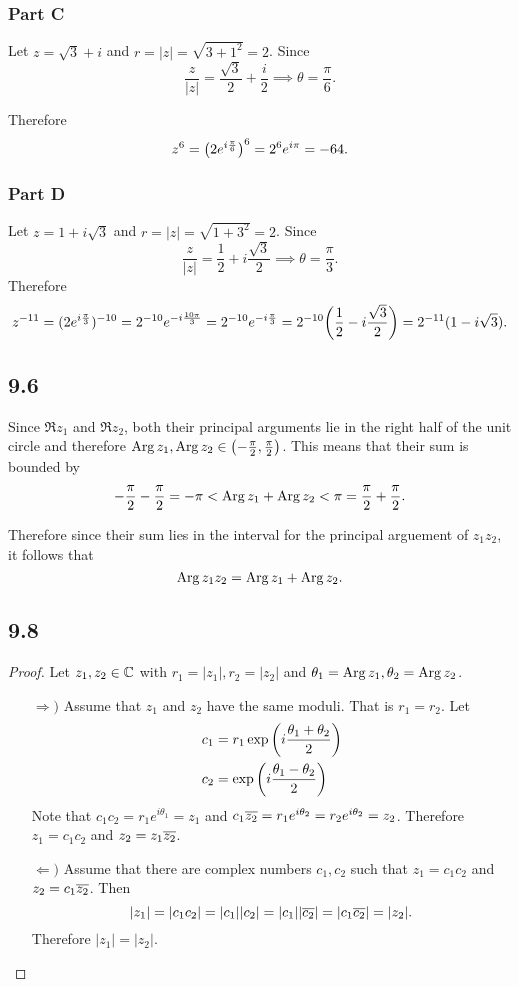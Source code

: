 \documentclass[12pt,titlepage]{extarticle}
\begin{document}
\subsubsection*{Part C}
Let $z = \sqrt{3} + i$ and $r = |z| = \sqrt{3 + 1^2} = 2$. Since
\[
    \frac{z}{|z|} = \frac{\sqrt{3}}{2} + \frac{i}{2} \implies \theta = \frac{\pi}{6}
.\]

Therefore
\[
    z^6 = \qty(2e^{i \frac{\pi}{6}})^6 = 2^6 e^{i \pi} = -64
.\]


\subsubsection*{Part D}
Let $z = 1 + i \sqrt{3}$ and $r = |z| = \sqrt{1 + 3^2} = 2$. Since
\[
    \frac{z}{|z|} = \frac{1}{2} + i\frac{\sqrt{3}}{2} \implies \theta = \frac{\pi}{3}
.\]
Therefore
\[
    z^{-11} = (2 e^{i \frac{\pi}{3}})^{-10} = 2^{-10} e^{-i \frac{10 \pi}{3}} = 2^{-10} e^{-i \frac{\pi}{3}} = 2^{-10} \qty(\frac{1}{2} - i\frac{\sqrt{3}}{2}) = 2^{-11} (1 - i\sqrt{3})
.\]


\subsection*{9.6}
Since $\Re z_1$ and $\Re z_2$, both their principal arguments lie in the right half of the unit circle and therefore $\operatorname{Arg} z_1, \operatorname{Arg} z_2 \in \qty(-\frac{\pi}{2}, \frac{\pi}{2})$. This means that their sum is bounded by
\[
    -\frac{\pi}{2} - \frac{\pi}{2} = -\pi < \operatorname{Arg} z_1 + \operatorname{Arg} z_2 < \pi = \frac{\pi}{2} + \frac{\pi}{2}
.\]

Therefore since their sum lies in the interval for the principal arguement of $z_1z_2$, it follows that
\[
    \operatorname{Arg} z_1 z_2 = \operatorname{Arg} z_1 + \operatorname{Arg} z_2
.\]

\subsection*{9.8}
\begin{proof}
    Let $z_1, z_2 \in \mathbb{C}$ with $r_1 = |z_1|, r_2 = |z_2|$ and $\theta_1 = \operatorname{Arg} z_1, \theta_2 = \operatorname{Arg} z_2$.
    \begin{enumerate}
        \item[$\Rightarrow)$]
            Assume that $z_1$ and $z_2$ have the same moduli. That is $r_1 = r_2$. Let
            \begin{align*}
                c_1 &= r_1 \exp\qty(i \frac{\theta_1 + \theta_2}{2}) \\
                c_2 &= \exp\qty(i \frac{\theta_1 - \theta_2}{2})
            \end{align*}
            Note that $c_1 c_2 = r_1 e^{i \theta_1} = z_1$ and $c_1 \overline{z_2} = r_1 e^{i \theta_2} = r_2 e^{i \theta_2} = z_2$. Therefore $z_1 = c_1 c_2$ and $z_2 = z_1 \overline{z_2}$.
        \item[$\Leftarrow)$]
            Assume that there are complex numbers $c_1, c_2$ such that $z_1 = c_1 c_2$ and $z_2 = c_1 \overline{z_2}$. Then
            \[
                |z_1| = |c_1 c_2| = |c_1| |c_2| = |c_1||\overline{c_2}| = |c_1 \overline{c_2}| = |z_2|
            .\]
            Therefore $|z_1| = |z_2|$.
    \end{enumerate}
\end{proof}
\end{document}

